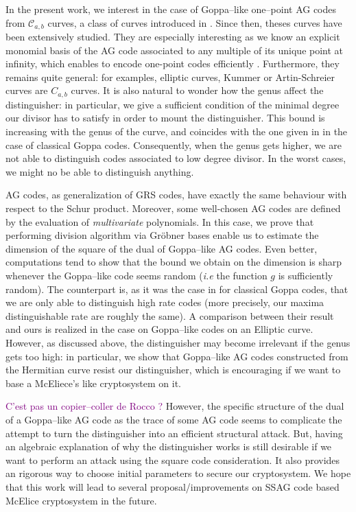 \documentclass[a4paper]{article}
\theoremstyle{definition}
\theoremstyle{remark}
\newcommand{\calC}{\mathcal{C}}
\newcommand\jade[1]{\textcolor{purple}{#1}}
\begin{document}
In the present work, we interest in the case of Goppa--like one--point AG codes from $\calC_{a,b}$ curves, a class of curves introduced in \cite{Miu93}. Since then, theses curves have been extensively studied. They are especially interesting as we know an explicit monomial basis of the AG code associated to any multiple of its unique point at infinity, which enables to encode one-point codes efficiently \cite{BRS21}. Furthermore, they remains quite general: for examples, elliptic curves, Kummer or Artin-Schreier curves are $C_{a,b}$ curves. It is also natural to wonder how the genus affect the distinguisher: in particular, we give a sufficient condition of the minimal degree our divisor has to satisfy in order to mount the distinguisher. This bound is increasing with the genus of the curve, and coincides with the one given in \cite{MT21} in the case of classical Goppa codes. Consequently, when the genus gets higher, we are not able to distinguish codes associated to low degree divisor. In the worst cases, we might no be able to distinguish anything.

AG codes, as generalization of GRS codes, have exactly the same behaviour with respect to the Schur product. Moreover, some well-chosen AG codes are defined by the evaluation of \textit{multivariate} polynomials. In this case, we prove that performing division algorithm via Gröbner bases enable us to estimate the dimension of the square of the dual of Goppa--like AG codes. Even better, computations tend to show that the bound we obtain on the dimension is sharp whenever the Goppa--like code seems random (\emph{i.e} the function $g$ is sufficiently random). The counterpart is, as it was the case in \cite{MT21} for classical Goppa codes, that we are only able to distinguish high rate codes (more precisely, our maxima distinguishable rate are roughly the same). A comparison between their result and ours is realized in the case on Goppa--like codes on an Elliptic curve. However, as discussed above, the distinguisher may become irrelevant if the genus gets too high: in particular, we show that Goppa--like AG codes constructed from the Hermitian curve resist our distinguisher, which is encouraging if we want to base a McEliece's like cryptosystem on it.

\jade{C'est pas un copier--coller de Rocco ?} However, the specific structure of the dual of a Goppa--like AG code as the trace of some AG code seems to complicate the attempt to turn the distinguisher into an efficient structural attack. But, having an algebraic explanation of why the distinguisher works is still desirable if we want to perform an attack using the square code consideration. It also provides an rigorous way to choose initial parameters to secure our cryptosystem.
We hope that this work will lead to several proposal/improvements on SSAG code based McElice cryptosystem in the future.
\end{document}

